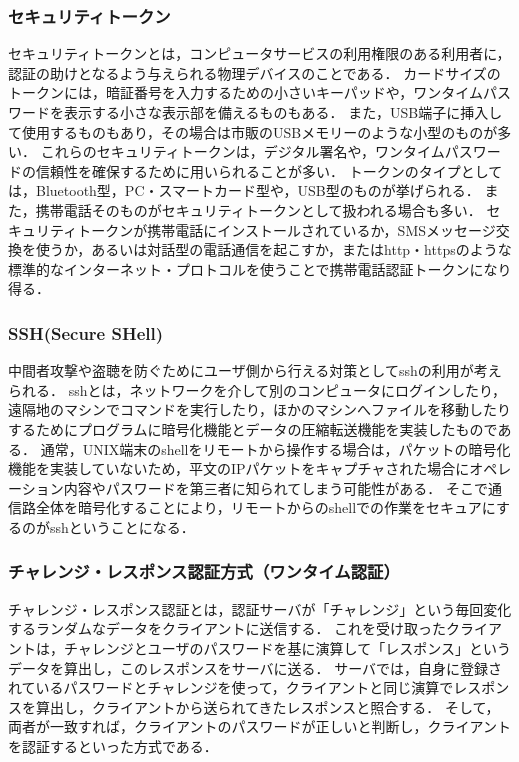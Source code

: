 \subsubsection{セキュリティトークン}
セキュリティトークンとは，コンピュータサービスの利用権限のある利用者に，認証の助けとなるよう与えられる物理デバイスのことである．
カードサイズのトークンには，暗証番号を入力するための小さいキーパッドや，ワンタイムパスワードを表示する小さな表示部を備えるものもある．
また，USB端子に挿入して使用するものもあり，その場合は市販のUSBメモリーのような小型のものが多い．
これらのセキュリティトークンは，デジタル署名や，ワンタイムパスワードの信頼性を確保するために用いられることが多い．
トークンのタイプとしては，Bluetooth型，PC・スマートカード型や，USB型のものが挙げられる．
また，携帯電話そのものがセキュリティトークンとして扱われる場合も多い．
セキュリティトークンが携帯電話にインストールされているか，SMSメッセージ交換を使うか，あるいは対話型の電話通信を起こすか，またはhttp・httpsのような標準的なインターネット・プロトコルを使うことで携帯電話認証トークンになり得る．

\subsubsection{SSH(Secure SHell)}
中間者攻撃や盗聴を防ぐためにユーザ側から行える対策としてsshの利用が考えられる．
sshとは，ネットワークを介して別のコンピュータにログインしたり，遠隔地のマシンでコマンドを実行したり，ほかのマシンへファイルを移動したりするためにプログラムに暗号化機能とデータの圧縮転送機能を実装したものである．
通常，UNIX端末のshellをリモートから操作する場合は，パケットの暗号化機能を実装していないため，平文のIPパケットをキャプチャされた場合にオペレーション内容やパスワードを第三者に知られてしまう可能性がある．
そこで通信路全体を暗号化することにより，リモートからのshellでの作業をセキュアにするのがsshということになる．

\subsubsection{チャレンジ・レスポンス認証方式（ワンタイム認証）}
チャレンジ・レスポンス認証とは，認証サーバが「チャレンジ」という毎回変化するランダムなデータをクライアントに送信する．
これを受け取ったクライアントは，チャレンジとユーザのパスワードを基に演算して「レスポンス」というデータを算出し，このレスポンスをサーバに送る．
サーバでは，自身に登録されているパスワードとチャレンジを使って，クライアントと同じ演算でレスポンスを算出し，クライアントから送られてきたレスポンスと照合する．
そして，両者が一致すれば，クライアントのパスワードが正しいと判断し，クライアントを認証するといった方式である．

